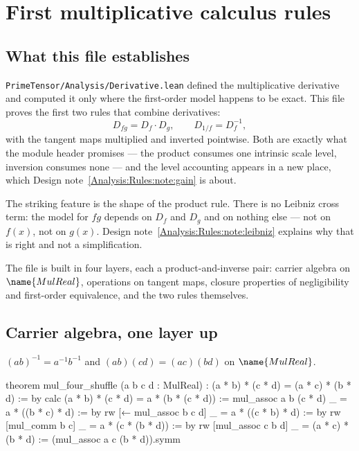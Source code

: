 
\section{First multiplicative calculus rules}
\label{Analysis:Rules:sec}


\subsection*{What this file establishes}

\texttt{PrimeTensor/Analysis/Derivative.lean} defined the multiplicative
derivative and computed it only where the first-order model happens to be
exact.  This file proves the first two rules that combine derivatives:
\[
  D_{fg} = D_f \cdot D_g,
  \qquad
  D_{1/f} = D_f^{-1},
\]
with the tangent maps multiplied and inverted pointwise.  Both are exactly
what the module header promises --- the product consumes one intrinsic scale
level, inversion consumes none --- and the level accounting appears in a new
place, which Design note~\ref{Analysis:Rules:note:gain} is about.

The striking feature is the shape of the product rule.  There is no Leibniz
cross term: the model for $fg$ depends on $D_f$ and $D_g$ and on nothing else
--- not on $f(x)$, not on $g(x)$.
Design note~\ref{Analysis:Rules:note:leibniz} explains why that is right and
not a simplification.

The file is built in four layers, each a product-and-inverse pair: carrier
algebra on $\name{MulReal}$, operations on tangent maps, closure properties of
negligibility and first-order equivalence, and the two rules themselves.

\subsection{Carrier algebra, one layer up}

\begin{lemma}
\label{Analysis:Rules:lem:algebra}
$(ab)^{-1} = a^{-1}b^{-1}$ and $(ab)(cd) = (ac)(bd)$ on $\name{MulReal}$.
\end{lemma}

\begin{leancode}
theorem mul_four_shuffle (a b c d : MulReal) :
    (a * b) * (c * d) = (a * c) * (b * d) := by
  calc
    (a * b) * (c * d)
        = a * (b * (c * d)) := mul_assoc a b (c * d)
    _ = a * ((b * c) * d) := by
      rw [← mul_assoc b c d]
    _ = a * ((c * b) * d) := by
      rw [mul_comm b c]
    _ = a * (c * (b * d)) := by
      rw [mul_assoc c b d]
    _ = (a * c) * (b * d) := (mul_assoc a c (b * d)).symm
\end{leancode}

